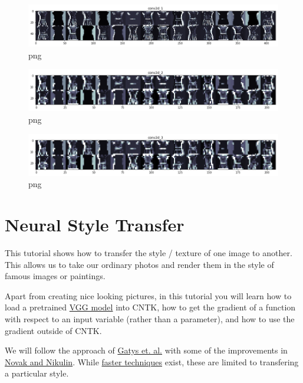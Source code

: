 \documentclass[]{book}
\theoremstyle{definition}
\theoremstyle{definition}
\theoremstyle{definition}
\theoremstyle{remark}
\begin{document}
\begin{figure}
\centering
\includegraphics{output_13_0.png}
\caption{png}
\end{figure}

\begin{figure}
\centering
\includegraphics{output_13_1.png}
\caption{png}
\end{figure}

\begin{figure}
\centering
\includegraphics{output_13_2.png}
\caption{png}
\end{figure}

\chapter{Neural Style Transfer}\label{neural-style-transfer}

This tutorial shows how to transfer the style / texture of one image to
another. This allows us to take our ordinary photos and render them in
the style of famous images or paintings.

Apart from creating nice looking pictures, in this tutorial you will
learn how to load a pretrained
\href{https://arxiv.org/abs/1409.1556}{VGG model} into CNTK, how to get
the gradient of a function with respect to an input variable (rather
than a parameter), and how to use the gradient outside of CNTK.

We will follow the approach of
\href{https://arxiv.org/abs/1508.06576}{Gatys et. al.} with some of the
improvements in \href{https://arxiv.org/abs/1605.04603}{Novak and
Nikulin}. While \href{https://arxiv.org/abs/1603.08155}{faster
techniques} exist, these are limited to transfering a particular style.
\end{document}
